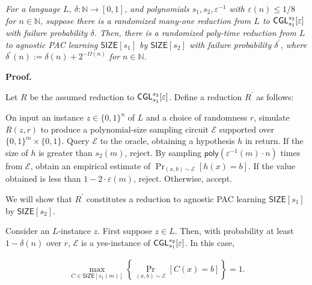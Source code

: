 \emph{For a language $L$, $\delta:\mathbb{N}\to[0,1]$, and polynomials $s_{1},s_{2},\varepsilon^{-1}$ with $\varepsilon(n)\leq 1/8$ for $n\in\mathbb{N}$, suppose there is a randomized many-one reduction from $L$ to ${\sf CGL}_{s_{1}}^{s_{2}}[\varepsilon]$ with failure probability $\delta$. Then, there is a randomized poly-time reduction from $L$ to agnostic PAC learning ${\mathsf{SIZE}}[s_{1}]$ by ${\mathsf{SIZE}}[s_{2}]$ with failure probability $\delta^{\prime}$, where $\delta^{\prime}(n):=\delta(n)+2^{-\Omega(n)}$ for $n\in\mathbb{N}$.}\par






\par\medskip\noindent\textbf{Proof.}\par




Let $R$ be the assumed reduction to ${\sf CGL}_{s_{1}}^{s_{2}}[\varepsilon]$. Define a reduction $R^{\prime}$ as follows:\par



On input an instance $z\in\{0,1\}^{n}$ of $L$ and a choice of randomness $r$, simulate $R(z,r)$ to produce a polynomial-size sampling circuit $\mathcal{E}$ supported over $\{0,1\}^{m}\times\{0,1\}$. Query $\mathcal{E}$ to the oracle, obtaining a hypothesis $h$ in return. If the size of $h$ is greater than $s_{2}(m)$, reject. By sampling ${\mathsf{poly}}(\varepsilon^{-1}(m)\cdot n)$ times from $\mathcal{E}$, obtain an empirical estimate of $\Pr_{(x,b)\sim\mathcal{E}}[h(x)=b]$. If the value obtained is less than $1-2\cdot\varepsilon(m)$, reject. Otherwise, accept.\par



We will show that $R^{\prime}$ constitutes a reduction to agnostic PAC learning ${\mathsf{SIZE}}[s_{1}]$ by ${\mathsf{SIZE}}[s_{2}]$.\par




Consider an $L$-instance $z$. First suppose $z\in L$. Then, with probability at least $1-\delta(n)$ over $r$, $\mathcal{E}$ is a yes-instance of ${\sf CGL}_{s_{1}}^{s_{2}}[\varepsilon]$. In this case,\par


\[\begin{gathered}
\max_{C\in{\mathsf{SIZE}}[s_{1}(m)]}\left\{\Pr_{(x,b)\sim\mathcal{E}}[C(x)=b]\right\}=1.
\end{gathered}\]


